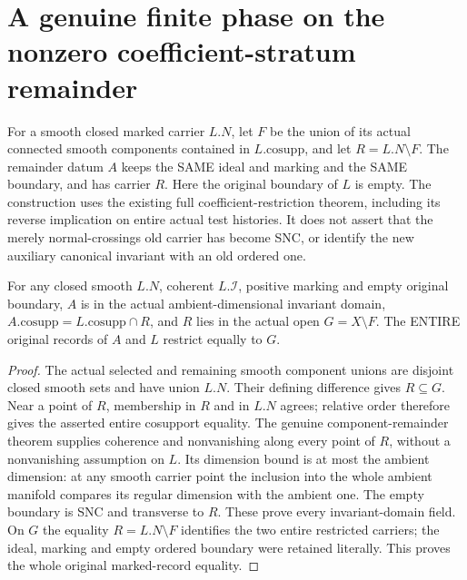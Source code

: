 \section{A genuine finite phase on the nonzero coefficient-stratum remainder}
\label{sec:nc-coefficient-nonzero-remainder-phase}

For a smooth closed marked carrier $L.N$, let $F$ be the union of its actual
connected smooth components contained in $L.\mathrm{cosupp}$, and let
$R=L.N\setminus F$. The remainder datum $A$ keeps the SAME ideal and marking
and the SAME boundary, and has carrier $R$. Here the original boundary of
$L$ is empty. The construction uses the existing full coefficient-restriction
theorem, including its reverse implication on entire actual test histories.
It does not assert that the merely normal-crossings old carrier has become
SNC, or identify the new auxiliary canonical invariant with an old ordered one.

\begin{theorem}
\label{hir:nc-coefficient-remainder-original-domain}
\leanok
For any closed smooth $L.N$, coherent $L.\mathcal I$, positive marking and empty
original boundary, $A$ is in the actual ambient-dimensional invariant domain,
$A.\mathrm{cosupp}=L.\mathrm{cosupp}\cap R$, and $R$ lies in the actual open
$G=X\setminus F$. The ENTIRE original records of $A$ and $L$ restrict equally
to $G$.
\end{theorem}
\begin{proof}
The actual selected and remaining smooth component unions are disjoint closed
smooth sets and have union $L.N$. Their defining difference gives
$R\subseteq G$. Near a point of $R$, membership in $R$ and in $L.N$ agrees;
relative order therefore gives the asserted entire cosupport equality.
The genuine component-remainder theorem supplies coherence and nonvanishing
along every point of $R$, without a nonvanishing assumption on $L$. Its dimension
bound is at most the ambient dimension: at any smooth carrier point the
inclusion into the whole ambient manifold compares its regular dimension
with the ambient one. The empty boundary is SNC and transverse to $R$.
These prove every invariant-domain field. On $G$ the equality
$R=L.N\setminus F$ identifies the two entire restricted carriers; the ideal,
marking and empty ordered boundary were retained literally. This proves the
whole original marked-record equality.
\end{proof}

